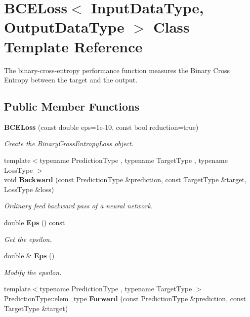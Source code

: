 \section{B\+C\+E\+Loss$<$ Input\+Data\+Type, Output\+Data\+Type $>$ Class Template Reference}
\label{classmlpack_1_1ann_1_1BCELoss}


The binary-\/cross-\/entropy performance function measures the Binary Cross Entropy between the target and the output.  


\subsection*{Public Member Functions}
\begin{DoxyCompactItemize}
\item 
\textbf{ B\+C\+E\+Loss} (const double eps=1e-\/10, const bool reduction=true)
\begin{DoxyCompactList}\small\item\em Create the Binary\+Cross\+Entropy\+Loss object. \end{DoxyCompactList}\item 
{\footnotesize template$<$typename Prediction\+Type , typename Target\+Type , typename Loss\+Type $>$ }\\void \textbf{ Backward} (const Prediction\+Type \&prediction, const Target\+Type \&target, Loss\+Type \&loss)
\begin{DoxyCompactList}\small\item\em Ordinary feed backward pass of a neural network. \end{DoxyCompactList}\item 
double \textbf{ Eps} () const
\begin{DoxyCompactList}\small\item\em Get the epsilon. \end{DoxyCompactList}\item 
double \& \textbf{ Eps} ()
\begin{DoxyCompactList}\small\item\em Modify the epsilon. \end{DoxyCompactList}\item 
{\footnotesize template$<$typename Prediction\+Type , typename Target\+Type $>$ }\\Prediction\+Type\+::elem\+\_\+type \textbf{ Forward} (const Prediction\+Type \&prediction, const Target\+Type \&target)

\end{DoxyCompactItemize}
